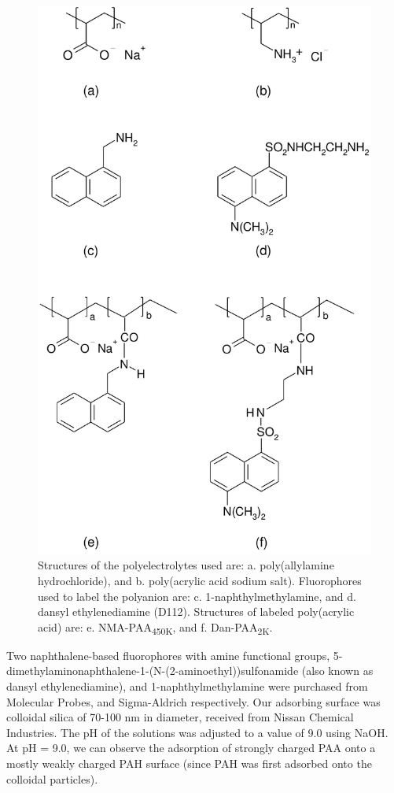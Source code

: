 \documentclass[twoside,twocolumn,9pt]{article}
\begin{document}
\begin{figure}[h]
    \includegraphics[scale=0.25]{Figure1.pdf}
    \caption{Structures of the polyelectrolytes used are: a. poly(allylamine hydrochloride), and b. poly(acrylic acid sodium salt).  Fluorophores used to label the polyanion are: c. 1-naphthylmethylamine, and d. dansyl ethylenediamine (D112).  Structures of labeled poly(acrylic acid) are: e. NMA-PAA\textsubscript{450K}, and f. Dan-PAA\textsubscript{2K}. }
    \label{figure 1}
\end{figure}


Two naphthalene-based fluorophores with amine functional groups, 5-dimethylaminonaphthalene-1-(N-(2-aminoethyl))sulfonamide (also known as dansyl ethylenediamine), and 1-naphthylmethylamine were purchased from Molecular Probes, and Sigma-Aldrich respectively.  Our adsorbing surface was colloidal silica of 70-100 nm in diameter, received from Nissan Chemical Industries. The pH of the solutions was adjusted to a value of 9.0 using NaOH.  At pH = 9.0, we can observe the adsorption of strongly charged PAA onto a mostly weakly charged PAH surface (since PAH was first adsorbed onto the colloidal particles).
\end{document}
